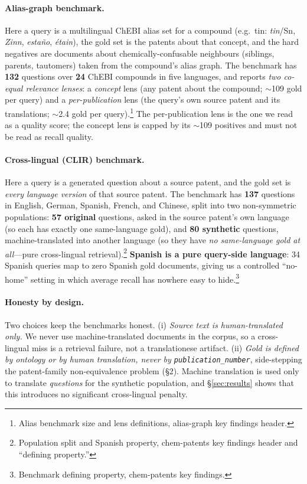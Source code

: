 \documentclass[11pt]{article}
\begin{document}
\paragraph{Alias-graph benchmark.}
Here a query is a multilingual ChEBI alias set for a compound (e.g.\ tin:
\emph{tin}/Sn, \emph{Zinn}, \emph{esta\~no}, \emph{\'etain}), the gold set is the
patents about that concept, and the hard negatives are documents about
chemically-confusable neighbours (siblings, parents, tautomers) taken from the
compound's alias graph. The benchmark has \textbf{132} questions over
\textbf{24} ChEBI compounds in five languages, and reports \emph{two co-equal
relevance lenses}: a \emph{concept} lens (any patent about the compound;
$\sim$109 gold per query) and a \emph{per-publication} lens (the query's own
source patent and its translations; $\sim$2.4 gold per query).\footnote{Alias
benchmark size and lens definitions, alias-graph key findings header.} The
per-publication lens is the one we read as a quality score; the concept lens is
capped by its $\sim$109 positives and must not be read as recall quality.

\paragraph{Cross-lingual (CLIR) benchmark.}
Here a query is a generated question about a source patent, and the gold set is
\emph{every language version} of that source patent. The benchmark has
\textbf{137} questions in English, German, Spanish, French, and Chinese, split
into two non-symmetric populations: \textbf{57 original} questions, asked in the
source patent's own language (so each has exactly one same-language gold), and
\textbf{80 synthetic} questions, machine-translated into another language (so
they have \emph{no same-language gold at all}---pure cross-lingual
retrieval).\footnote{Population split and Spanish property, chem-patents key
findings header and ``defining property.''} \textbf{Spanish is a pure
query-side language}: 34 Spanish queries map to zero Spanish gold documents,
giving us a controlled ``no-home'' setting in which average recall has nowhere
easy to hide.\footnote{Benchmark defining property, chem-patents key findings.}

\paragraph{Honesty by design.}
Two choices keep the benchmarks honest. (i) \emph{Source text is
human-translated only.} We never use machine-translated documents in the
corpus, so a cross-lingual miss is a retrieval failure, not a translationese
artifact. (ii) \emph{Gold is defined by ontology or by human translation, never
by \texttt{publication\_number}}, side-stepping the patent-family
non-equivalence problem (\S2). Machine translation is used only to translate
\emph{questions} for the synthetic population, and \S\ref{sec:results} shows
that this introduces no significant cross-lingual penalty.
\end{document}
